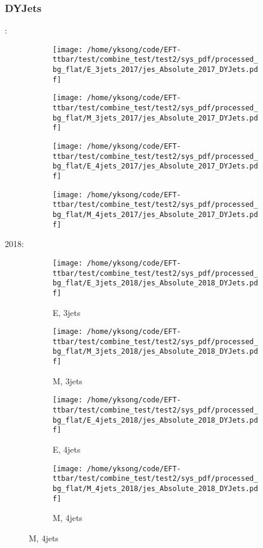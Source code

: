 \documentclass{beamer}
\begin{document}
\begin{frame}
\frametitle{DYJets}
\fontsize{5}{1}:
\begin{figure}
\centering
\begin{subfigure}[b]{0.24\textwidth}
\texttt{[image: /home/yksong/code/EFT-ttbar/test/combine\_test/test2/sys\_pdf/processed\_bg\_flat/E\_3jets\_2017/jes\_Absolute\_2017\_DYJets.pdf]}
\end{subfigure}
\begin{subfigure}[b]{0.24\textwidth}
\texttt{[image: /home/yksong/code/EFT-ttbar/test/combine\_test/test2/sys\_pdf/processed\_bg\_flat/M\_3jets\_2017/jes\_Absolute\_2017\_DYJets.pdf]}
\end{subfigure}
\begin{subfigure}[b]{0.24\textwidth}
\texttt{[image: /home/yksong/code/EFT-ttbar/test/combine\_test/test2/sys\_pdf/processed\_bg\_flat/E\_4jets\_2017/jes\_Absolute\_2017\_DYJets.pdf]}
\end{subfigure}
\begin{subfigure}[b]{0.24\textwidth}
\texttt{[image: /home/yksong/code/EFT-ttbar/test/combine\_test/test2/sys\_pdf/processed\_bg\_flat/M\_4jets\_2017/jes\_Absolute\_2017\_DYJets.pdf]}
\end{subfigure}
\end{figure}
2018:
\begin{figure}
\centering
\begin{subfigure}[b]{0.24\textwidth}
\texttt{[image: /home/yksong/code/EFT-ttbar/test/combine\_test/test2/sys\_pdf/processed\_bg\_flat/E\_3jets\_2018/jes\_Absolute\_2018\_DYJets.pdf]}
\captionsetup{font=tiny}
\caption{E, 3jets}
\end{subfigure}
\begin{subfigure}[b]{0.24\textwidth}
\texttt{[image: /home/yksong/code/EFT-ttbar/test/combine\_test/test2/sys\_pdf/processed\_bg\_flat/M\_3jets\_2018/jes\_Absolute\_2018\_DYJets.pdf]}
\captionsetup{font=tiny}
\caption{M, 3jets}
\end{subfigure}
\begin{subfigure}[b]{0.24\textwidth}
\texttt{[image: /home/yksong/code/EFT-ttbar/test/combine\_test/test2/sys\_pdf/processed\_bg\_flat/E\_4jets\_2018/jes\_Absolute\_2018\_DYJets.pdf]}
\captionsetup{font=tiny}
\caption{E, 4jets}
\end{subfigure}
\begin{subfigure}[b]{0.24\textwidth}
\texttt{[image: /home/yksong/code/EFT-ttbar/test/combine\_test/test2/sys\_pdf/processed\_bg\_flat/M\_4jets\_2018/jes\_Absolute\_2018\_DYJets.pdf]}
\captionsetup{font=tiny}
\caption{M, 4jets}
\end{subfigure}
\end{figure}
\end{frame}
\end{document}
